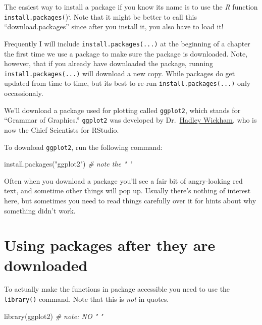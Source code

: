 \documentclass[
]{book}
\newenvironment{Shaded}{\begin{snugshade}}{\end{snugshade}}
\newcommand{\CommentTok}[1]{\textcolor[rgb]{0.56,0.35,0.01}{\textit{#1}}}
\newcommand{\FunctionTok}[1]{\textcolor[rgb]{0.00,0.00,0.00}{#1}}
\newcommand{\NormalTok}[1]{#1}
\newcommand{\StringTok}[1]{\textcolor[rgb]{0.31,0.60,0.02}{#1}}
\begin{document}
The easiest way to install a package if you know its name is to use the \emph{R} function \texttt{install.packages(})`. Note that it might be better to call this ``download.packages'' since after you install it, you also have to load it!

Frequently I will include \texttt{install.packages(...)} at the beginning of a chapter the first time we use a package to make sure the package is downloaded. Note, however, that if you already have downloaded the package, running \texttt{install.packages(...)} will download a new copy. While packages do get updated from time to time, but its best to re-run \texttt{install.packages(...)} only occassionaly.

We'll download a package used for plotting called \texttt{ggplot2}, which stands for ``Grammar of Graphics.'' \texttt{ggplot2} was developed by Dr.~\href{http://hadley.nz/}{Hadley Wickham}, who is now the Chief Scientists for RStudio.

To download \texttt{ggplot2}, run the following command:

\begin{Shaded}
\begin{Highlighting}[]
\FunctionTok{install.packages}\NormalTok{(}\StringTok{"ggplot2"}\NormalTok{) }\CommentTok{\# note the " "}
\end{Highlighting}
\end{Shaded}

Often when you download a package you'll see a fair bit of angry-looking red text, and sometime other things will pop up. Usually there's nothing of interest here, but sometimes you need to read things carefully over it for hints about why something didn't work.

\hypertarget{using-packages-after-they-are-downloaded}{%
\section{Using packages after they are downloaded}\label{using-packages-after-they-are-downloaded}}

To actually make the functions in package accessible you need to use the \texttt{library()} command. Note that this is \emph{not} in quotes.

\begin{Shaded}
\begin{Highlighting}[]
\FunctionTok{library}\NormalTok{(ggplot2) }\CommentTok{\# note: NO " "}
\end{Highlighting}
\end{Shaded}
\end{document}
